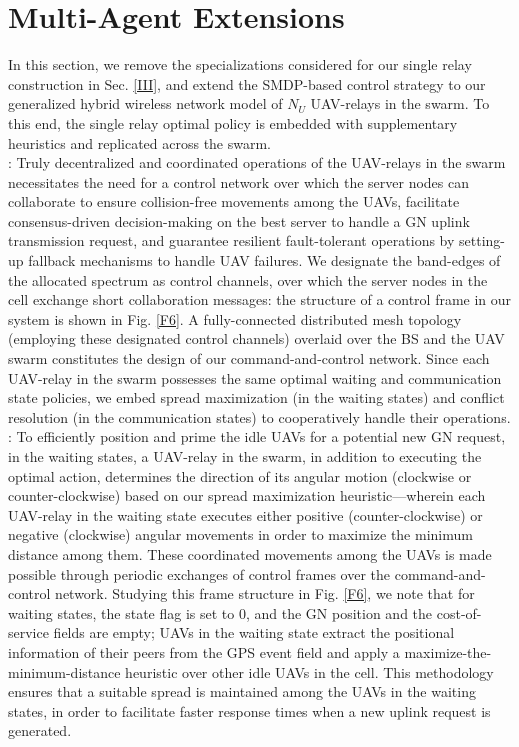 \documentclass[10pt,twocolumn]{IEEEtran}
\begin{document}
\vspace{-6mm}
\section{Multi-Agent Extensions}\label{IV}
In this section, we remove the specializations considered for our single relay construction in Sec. \ref{III}, and extend the SMDP-based control strategy to our generalized hybrid wireless network model of $N_{U}$ UAV-relays in the swarm. To this end, the single relay optimal policy is embedded with supplementary heuristics and replicated across the swarm.\\
: Truly decentralized and coordinated operations of the UAV-relays in the swarm necessitates the need for a control network over which the server nodes can collaborate to ensure collision-free movements among the UAVs, facilitate consensus-driven decision-making on the best server to handle a GN uplink transmission request, and guarantee resilient fault-tolerant operations by setting-up fallback mechanisms to handle UAV failures. We designate the band-edges of the allocated spectrum as control channels, over which the server nodes in the cell exchange short collaboration messages: the structure of a control frame in our system is shown in Fig. \ref{F6}. A fully-connected distributed mesh topology (employing these designated control channels) overlaid over the BS and the UAV swarm constitutes the design of our command-and-control network. Since each UAV-relay in the swarm possesses the same optimal waiting and communication state policies, we embed spread maximization (in the waiting states) and conflict resolution (in the communication states) to cooperatively handle their operations.\\
: To efficiently position and prime the idle UAVs for a potential new GN request, in the waiting states, a UAV-relay in the swarm, in addition to executing the optimal action, determines the direction of its angular motion (clockwise or counter-clockwise) based on our spread maximization heuristic---wherein each UAV-relay in the waiting state executes either positive (counter-clockwise) or negative (clockwise) angular movements in order to maximize the minimum distance among them. These coordinated movements among the UAVs is made possible through periodic exchanges of control frames over the command-and-control network. Studying this frame structure in Fig. \ref{F6}, we note that for waiting states, the state flag is set to $0$, and the GN position and the cost-of-service fields are empty; UAVs in the waiting state extract the positional information of their peers from the GPS event field and apply a maximize-the-minimum-distance heuristic over other idle UAVs in the cell. This methodology ensures that a suitable spread is maintained among the UAVs in the waiting states, in order to facilitate faster response times when a new uplink request is generated.
\end{document}
